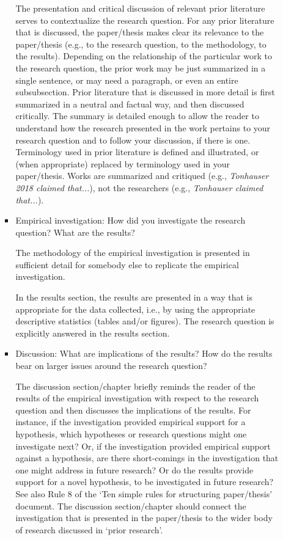 \documentclass[11pt,fleqn,a4paper/thesis]{article}
\newcommand{\6}{\mbox{$[\hspace*{-.6mm}[$}}
\newcommand{\9}{\mbox{$]\hspace*{-.6mm}]$}}
\begin{document}
\begin{itemize}[itemsep=-1pt,leftmargin=2.5ex,topsep=-2pt]
\begin{enumerate}
\begin{itemize}[leftmargin=2.5ex,topsep=-2pt]
The presentation and critical discussion of relevant prior literature serves to contextualize the research question. For any prior literature that is discussed, the paper/thesis makes clear its relevance to the paper/thesis (e.g., to the research question, to the methodology, to the results). Depending on the relationship of the particular work to the research question, the prior work may be just summarized in a single sentence, or may need a paragraph, or even an entire subsubsection. Prior literature that is discussed in more detail is first summarized in a neutral and factual way, and then discussed critically. The summary is detailed enough to allow the reader to understand how the research presented in the work pertains to your research question and to follow your discussion, if there is one. Terminology used in prior literature is defined and illustrated, or (when appropriate) replaced by terminology used in your paper/thesis. Works are summarized and critiqued (e.g., {\em Tonhauser 2018 claimed that...}), not the researchers (e.g., {\em Tonhauser claimed that...}). 

\item Empirical investigation: How did you investigate the research question? What are the results?

The methodology of the empirical investigation is presented in sufficient detail for somebody else to replicate the empirical investigation. 

In the results section, the results are presented in a way that is appropriate for the data collected, i.e., by using the appropriate descriptive statistics (tables and/or figures). The research question is explicitly answered in the results section.

\item Discussion: What are implications of the results? How do the results bear on larger issues around the research question?

The discussion section/chapter briefly reminds the reader of the results of the empirical investigation with respect to the research question and then discusses the implications of the results. For instance, if the investigation provided empirical support for a hypothesis, which hypotheses or research questions might one investigate next? Or, if the investigation provided empirical support against a hypothesis, are there short-comings in the investigation that one might address in future research? Or do the results provide support for a novel hypothesis, to be investigated in future research? See also Rule 8 of the `Ten simple rules for structuring paper/thesis' document. The discussion section/chapter should connect the investigation that is presented in the paper/thesis to the wider body of research discussed in `prior research'.


\end{itemize}
\end{enumerate}
\end{itemize}
\end{document}
